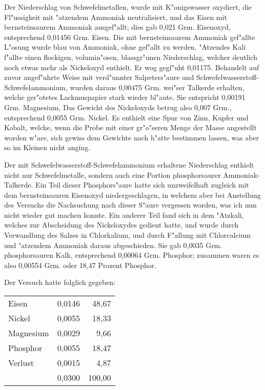 \documentclass[a4paper, 11pt, oneside]{article}
\begin{document}
Der Niederschlag von Schwefelmetallen, wurde mit K"onigswasser oxydiert, die Fl"ussigkeit mit "atzendem Ammoniak neutralisiert, und das Eisen mit bernsteinsaurem Ammoniak ausgef"allt; dies gab 0,021 Grm. Eisenoxyd, entsprechend 0,01456 Grm. Eisen. Die mit bernsteinsaurem Ammoniak gef"allte L"osung wurde blau von Ammoniak, ohne gef"allt zu werden. "Atzendes Kali f"allte einen flockigen, volumin"osen, blassgr"unen Niederschlag, welcher deutlich noch etwas mehr als Nickeloxyd enthielt. Er wog gegl"uht 0,01175. Behandelt auf zuvor angef"uhrte Weise mit verd"unnter Salpeters"aure und Schwefelwasserstoff-Schwefelammonium, wurden daraus 0,00475 Grm. wei"ser Talkerde erhalten, welche ger"otetes Lackmuspapier stark wieder bl"aute. Sie entspricht 0,00191 Grm. Magnesium, Das Gewicht des Nickeloxyds betrug also 0,007 Grm., entsprechend 0,0055 Grm. Nickel. Es enthielt eine Spur von Zinn, Kupfer und Kobalt, welche, wenn die Probe mit einer gr"o"seren Menge der Masse angestellt worden w"are, sich gewiss dem Gewichte nach h"atte bestimmen lassen, was aber so im Kleinen nicht anging.

Der mit Schwefelwasserstoff-Schwefelammonium erhaltene Niederschlag enthielt nicht nur Schwefelmetalle, sondern auch eine Portion phosphorsaurer Ammoniak-Talkerde. Ein Teil dieser Phosphors"aure hatte sich unzweifelhaft zugleich mit dem bernsteinsauren Eisenoxyd niedergeschlagen, in welchem aber bei Anstellung des Versuchs die Nachsuchung nach dieser S"aure vergessen worden, was ich nun nicht wieder gut machen konnte. Ein anderer Teil fand sich in dem "Atzkali, welches zur Abscheidung des Nickeloxydes gedient hatte, und wurde durch Verwandlung des Salzes in Chlorkalium, und durch F"allung mit Chlorcalcium und "atzendem Ammoniak daraus abgeschieden. Sie gab 0,0035 Grm. phosphorsauren Kalk, entsprechend 0,00064 Grm. Phosphor; zusammen waren es also 0,00554 Grm. oder 18,47 Prozent Phosphor.

Der Versuch hatte folglich gegeben:
\begin{center}
\begin{tabular}{ l r r }
    Eisen & 0,0146 & 48,67\\
    Nickel & 0,0055 & 18,33\\
    Magnesium & 0,0029 & 9,66\\
    Phosphor & 0,0055 & 18,47\\
    Verlust & 0,0015 & 4,87\\\hline
    & 0,0300 & 100,00\\
\end{tabular}
\end{center}
\end{document}
